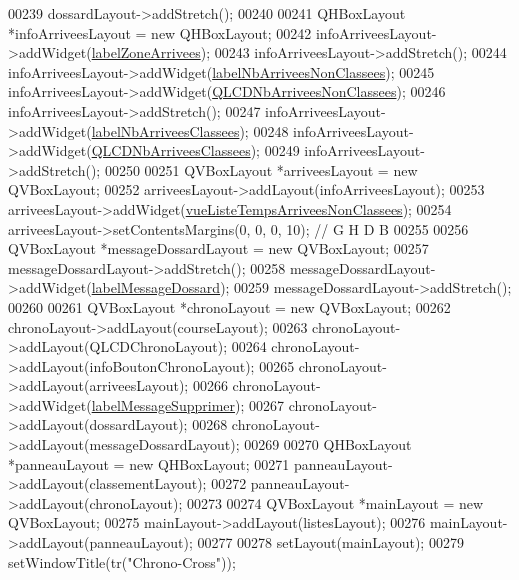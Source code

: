 \begin{DoxyCode}
00239     dossardLayout->addStretch();
00240 
00241     QHBoxLayout *infoArriveesLayout = \textcolor{keyword}{new} QHBoxLayout;
00242     infoArriveesLayout->addWidget(\hyperlink{class_i_h_m_chrono_cross_a56f6c02a8d3274c4359f12709cefa5d2}{labelZoneArrivees});
00243     infoArriveesLayout->addStretch();
00244     infoArriveesLayout->addWidget(\hyperlink{class_i_h_m_chrono_cross_a3249b3528e5b75353bb8fb80d27eefe3}{labelNbArriveesNonClassees});
00245     infoArriveesLayout->addWidget(\hyperlink{class_i_h_m_chrono_cross_a9cf1b999b13e69fdd0fb11ddb9011ed5}{QLCDNbArriveesNonClassees});
00246     infoArriveesLayout->addStretch();
00247     infoArriveesLayout->addWidget(\hyperlink{class_i_h_m_chrono_cross_a08fd415de59fe6f42663f3f36f074e61}{labelNbArriveesClassees});
00248     infoArriveesLayout->addWidget(\hyperlink{class_i_h_m_chrono_cross_aeba189eacad7e19e009ae4764f98b9be}{QLCDNbArriveesClassees});
00249     infoArriveesLayout->addStretch();
00250 
00251     QVBoxLayout *arriveesLayout = \textcolor{keyword}{new} QVBoxLayout;
00252     arriveesLayout->addLayout(infoArriveesLayout);
00253     arriveesLayout->addWidget(\hyperlink{class_i_h_m_chrono_cross_aaf04338d882f708e57d9872b1c82b7a0}{vueListeTempsArriveesNonClassees});
00254     arriveesLayout->setContentsMargins(0, 0, 0, 10); \textcolor{comment}{// G H D B}
00255 
00256     QVBoxLayout *messageDossardLayout = \textcolor{keyword}{new} QVBoxLayout;
00257     messageDossardLayout->addStretch();
00258     messageDossardLayout->addWidget(\hyperlink{class_i_h_m_chrono_cross_abd23647486d38e6f57aef1faf50757af}{labelMessageDossard});
00259     messageDossardLayout->addStretch();
00260 
00261     QVBoxLayout *chronoLayout = \textcolor{keyword}{new} QVBoxLayout;
00262     chronoLayout->addLayout(courseLayout);
00263     chronoLayout->addLayout(QLCDChronoLayout);
00264     chronoLayout->addLayout(infoBoutonChronoLayout);
00265     chronoLayout->addLayout(arriveesLayout);
00266     chronoLayout->addWidget(\hyperlink{class_i_h_m_chrono_cross_a6d818ff507406ebf299c571e0e5c1e49}{labelMessageSupprimer});
00267     chronoLayout->addLayout(dossardLayout);
00268     chronoLayout->addLayout(messageDossardLayout);
00269 
00270     QHBoxLayout *panneauLayout = \textcolor{keyword}{new} QHBoxLayout;
00271     panneauLayout->addLayout(classementLayout);
00272     panneauLayout->addLayout(chronoLayout);
00273 
00274     QVBoxLayout *mainLayout = \textcolor{keyword}{new} QVBoxLayout;
00275     mainLayout->addLayout(listesLayout);
00276     mainLayout->addLayout(panneauLayout);
00277 
00278     setLayout(mainLayout);
00279     setWindowTitle(tr(\textcolor{stringliteral}{"Chrono-Cross"}));

\end{DoxyCode}
